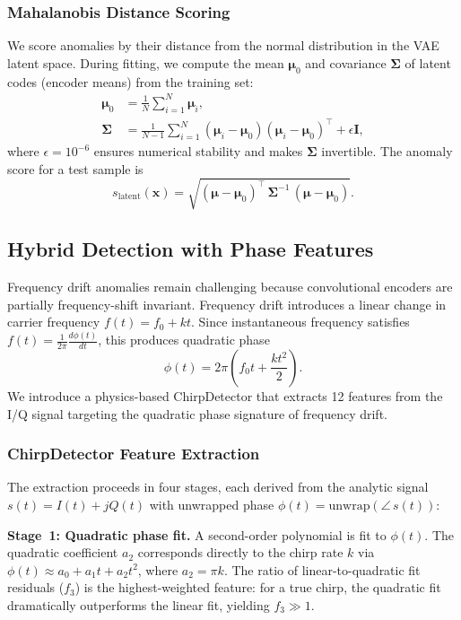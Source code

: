 \documentclass[conference]{IEEEtran}
\begin{document}
\subsubsection{Mahalanobis Distance Scoring}
We score anomalies by their distance from the normal distribution in the VAE latent space. During fitting, we compute the mean $\boldsymbol{\mu}_0$ and covariance $\boldsymbol{\Sigma}$ of latent codes (encoder means) from the training set:
\begin{align}
\boldsymbol{\mu}_0 &= \frac{1}{N}\sum_{i=1}^{N} \boldsymbol{\mu}_i,\\
\boldsymbol{\Sigma} &= \frac{1}{N-1}\sum_{i=1}^{N}(\boldsymbol{\mu}_i-\boldsymbol{\mu}_0)(\boldsymbol{\mu}_i-\boldsymbol{\mu}_0)^{\top} + \epsilon \mathbf{I},
\end{align}
where $\epsilon = 10^{-6}$ ensures numerical stability and makes $\boldsymbol{\Sigma}$ invertible. The anomaly score for a test sample is
\begin{equation}
 s_{\mathrm{latent}}(\mathbf{x}) = \sqrt{(\boldsymbol{\mu}-\boldsymbol{\mu}_0)^{\top}\,\boldsymbol{\Sigma}^{-1}\,(\boldsymbol{\mu}-\boldsymbol{\mu}_0)}.
\end{equation}

\subsection{Hybrid Detection with Phase Features}
Frequency drift anomalies remain challenging because convolutional encoders are partially frequency-shift invariant. Frequency drift introduces a linear change in carrier frequency $f(t)=f_0+kt$. Since instantaneous frequency satisfies $f(t)=\frac{1}{2\pi}\frac{d\phi(t)}{dt}$, this produces quadratic phase
\begin{equation}
\phi(t) = 2\pi\left(f_0 t + \frac{k t^2}{2}\right).
\end{equation}
We introduce a physics-based ChirpDetector that extracts 12 features from the I/Q signal targeting the quadratic phase signature of frequency drift.

\subsubsection{ChirpDetector Feature Extraction}
The extraction proceeds in four stages, each derived from the analytic signal $s(t) = I(t) + jQ(t)$ with unwrapped phase $\phi(t) = \mathrm{unwrap}(\angle\, s(t))$:

\textbf{Stage~1: Quadratic phase fit.} A second-order polynomial is fit to $\phi(t)$. The quadratic coefficient $a_2$ corresponds directly to the chirp rate $k$ via $\phi(t) \approx a_0 + a_1 t + a_2 t^2$, where $a_2 = \pi k$. The ratio of linear-to-quadratic fit residuals ($f_3$) is the highest-weighted feature: for a true chirp, the quadratic fit dramatically outperforms the linear fit, yielding $f_3 \gg 1$.
\end{document}
